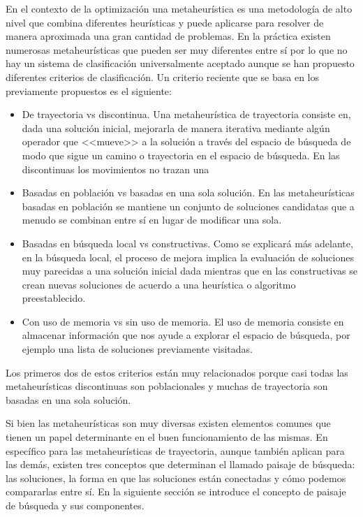 En el contexto de la optimización una metaheurística es una metodología de alto nivel que combina diferentes heurísticas y puede aplicarse para resolver de manera aproximada una gran cantidad de problemas. En la práctica existen numerosas metaheurísticas que pueden ser muy diferentes entre sí por lo que no hay un sistema de clasificación universalmente aceptado aunque se han propuesto diferentes criterios de clasificación. Un criterio reciente que se basa en los previamente propuestos es el siguiente\cite{Stegherr2020}:
\begin{itemize}
\item De trayectoria vs discontinua. Una metaheurística de trayectoria consiste en, dada una solución inicial, mejorarla de manera iterativa mediante algún operador que <<mueve>> a la solución a través del espacio de búsqueda de modo que sigue un camino o trayectoria en el espacio de búsqueda. En las discontinuas los movimientos no trazan una 
\item Basadas en población vs basadas en una sola solución. En las metaheurísticas basadas en población se mantiene un conjunto de soluciones candidatas que a menudo se combinan entre sí en lugar de modificar una sola.
\item Basadas en búsqueda local vs constructivas. Como se explicará más adelante, en la búsqueda local, el proceso de mejora implica la evaluación de soluciones muy parecidas a una solución inicial dada mientras que en las constructivas se crean nuevas soluciones de acuerdo a una heurística o algoritmo preestablecido.
\item Con uso de memoria vs sin uso de memoria. El uso de memoria consiste en almacenar información que nos ayude a explorar el espacio de búsqueda, por ejemplo una lista de soluciones previamente visitadas.
\end{itemize} 
Los primeros dos de estos criterios están muy relacionados porque casi todas las metaheurísticas discontinuas son poblacionales y muchas de trayectoria son basadas en una sola solución.


Si bien las metaheurísticas son muy diversas existen elementos comunes que tienen un papel determinante en el buen funcionamiento de las mismas. En específico para las metaheurísticas de trayectoria, aunque también aplican para las demás, existen tres conceptos que determinan el llamado paisaje de búsqueda: las soluciones, la forma en que las soluciones están conectadas y cómo podemos compararlas entre sí. En la siguiente sección se introduce el concepto de paisaje de búsqueda y sus componentes.
